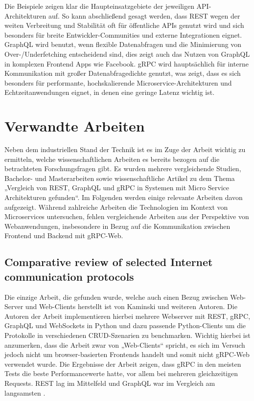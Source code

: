 Die Beispiele zeigen klar die Haupteinsatzgebiete der jeweiligen API-Architekturen auf. 
So kann abschließend gesagt werden, dass REST wegen der weiten Verbreitung und Stabilität oft für öffentliche APIs genutzt wird und sich besonders für breite Entwickler-Communities und externe Integrationen eignet.
GraphQL wird benutzt, wenn flexible Datenabfragen und die Minimierung von Over-/Underfetching entscheidend sind, dies zeigt auch das Nutzen von GraphQL in komplexen Frontend Apps wie Facebook.
gRPC wird hauptsächlich für interne Kommunikation mit großer Datenabfragedichte genutzt, was zeigt, dass es sich besonders für performante, hochskalierende Microservice-Architekturen und Echtzeitanwendungen eignet, in denen eine geringe Latenz wichtig ist.

\section{Verwandte Arbeiten}
Neben dem industriellen Stand der Technik ist es im Zuge der Arbeit wichtig zu ermitteln, welche wissenschaftlichen Arbeiten es bereits bezogen auf die betrachteten Forschungsfragen gibt. Es wurden mehrere vergleichende Studien, Bachelor- und Masterarbeiten sowie wissenschaftliche Artikel zu dem Thema „Vergleich von REST, GraphQL und gRPC in Systemen mit Micro Service Architekturen gefunden“. Im Folgenden werden einige relevante Arbeiten davon aufgezeigt. Während zahlreiche Arbeiten die Technologien im Kontext von Microservices untersuchen, fehlen vergleichende Arbeiten aus der Perspektive von Webanwendungen, insbesondere in Bezug auf die Kommunikation zwischen Frontend und Backend mit gRPC-Web.

\subsection{Comparative review of selected Internet communication protocols}
Die einzige Arbeit, die gefunden wurde, welche auch einen Bezug zwischen Web-Server und Web-Clients herstellt ist von Kaminski und weiteren Autoren. Die Autoren der Arbeit implementieren hierbei mehrere Webserver mit REST, gRPC, GraphQL und WebSockets in Python und dazu passende Python-Clients um die Protokolle in verschiedenen CRUD-Szenarien zu benchmarken. Wichtig hierbei ist anzumerken, dass die Arbeit zwar von „Web-Clients“ spricht, es sich  im Versuch jedoch nicht um browser-basierten Frontends handelt und somit nicht gRPC-Web verwendet wurde. Die Ergebnisse der Arbeit zeigen, dass gRPC in den meisten Tests die beste Performancewerte hatte, vor allem bei mehreren gleichzeitigen Requests. REST lag im Mittelfeld und GraphQL war im Vergleich am langsamsten  \parencite{Kaminski2022Comparative}. 

